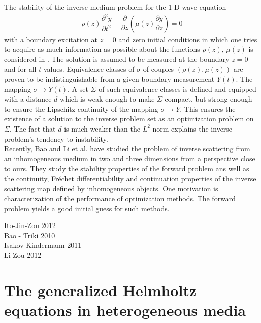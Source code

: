 \documentclass[12pt,twoside]{report}
\begin{document}
The stability of the inverse medium problem for the 1-D wave equation 
\begin{align*}
\rho(z)\dfrac{\partial^2 y }{\partial t^2}- \dfrac{\partial }{\partial z}\left( \mu(z) \dfrac{\partial y}{\partial z}\right) = 0 
\end{align*}
with a boundary excitation at $z=0$ and zero initial conditions in which one tries to acquire as much information as possible about the functions $\rho(z)$, $\mu(z)$ is considered in \cite{BambergerChaventLailly1979}. The solution is assumed to be measured at the boundary $z=0$ and for all $t$ values.  Equivalence classes of $\sigma$ of couples $(\rho(z), \mu(z))$ are proven to be indistinguishable from a given boundary measurement $Y(t)$. The mapping $\sigma \rightarrow Y(t)$. A set $\Sigma$ of such equivalence classes is defined and equipped with a distance $d$ which is weak enough to make $\Sigma$ compact, but strong enough to ensure the Lipschitz continuity of the mapping $\sigma \rightarrow Y$. This ensures the existence of a solution to the inverse problem set as an optimization problem on $\Sigma$. The fact that $d$ is much weaker than the $L^2$ norm explains the  inverse problem's tendency to instability.  \\

Recently, Bao and Li et al. \cite{BaoLi2005} have studied the problem of inverse scattering from an inhomogeneous medium in two and three dimensions from a perspective close to ours. They study the stability properties of the forward problem ans well as the continuity, Fr\'echet differentiability and continuation properties of the inverse scattering map defined by inhomogeneous objects. One motivation \cite{BaoHouLi2007} is characterization of the performance of optimization methods. The forward problem yields a good initial guess for such methods.  

Ito-Jin-Zou 2012\\
Bao - Triki 2010\\
Isakov-Kindermann 2011\\
Li-Zou 2012









\chapter{The generalized Helmholtz equations in heterogeneous media}
\end{document}
